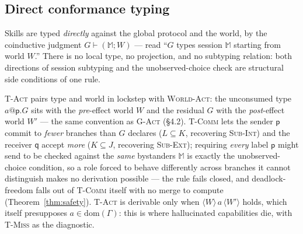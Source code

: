 \documentclass[11pt]{article}
\theoremstyle{plain}
\theoremstyle{definition}
\newcommand{\dom}{\mathrm{dom}}
\newcommand{\MM}{\mathbb{M}}
\newcommand{\ppar}{\;\|\;}
\begin{document}
\subsection{Direct conformance typing}
\label{sec:process-typing}
Skills are typed \emph{directly} against the global protocol and the world, by
the coinductive judgment $G\vdash(\MM;W)$ --- read ``$G$ types session $\MM$
starting from world $W$.'' There is no local type, no projection, and no
subtyping relation: both directions of session subtyping and the
unobserved-choice check are structural side conditions of one rule.
\textsc{T-Act} pairs type and world in lockstep with \textsc{World-Act}: the
unconsumed type $a@\mathsf p.G$ sits with the \emph{pre}-effect world $W$ and the
residual $G$ with the \emph{post}-effect world $W'$ --- the same convention as
\textsc{G-Act} (\S4.2). \textsc{T-Comm} lets the sender $\mathsf p$ commit to
\emph{fewer} branches than $G$ declares ($L\subseteq K$, recovering
\textsc{Sub-Int}) and the receiver $\mathsf q$ accept \emph{more}
($K\subseteq J$, recovering \textsc{Sub-Ext}); requiring \emph{every} label
$\mathsf p$ might send to be checked against the \emph{same} bystanders $\MM$ is
exactly the unobserved-choice condition, so a role forced to behave differently
across branches it cannot distinguish makes no derivation possible --- the rule
fails closed, and deadlock-freedom falls out of \textsc{T-Comm} itself with no
merge to compute (Theorem~\ref{thm:safety}). \textsc{T-Act} is derivable only
when $\langle W\rangle\,a\,\langle W'\rangle$ holds, which itself presupposes
$a\in\dom(\Gamma)$: this is where hallucinated capabilities die, with
\textsc{T-Miss} as the diagnostic.
\end{document}
